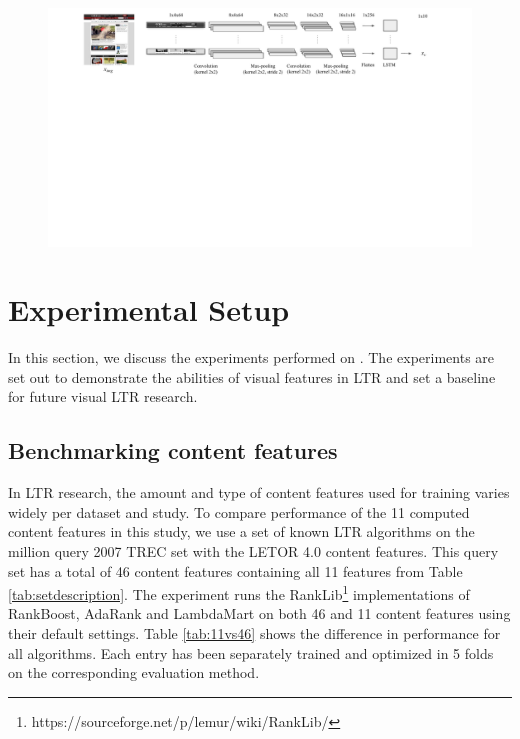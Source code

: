 \begin{figure}[t]
\centering
\includegraphics[clip,trim=0 10cm 0 0, width=20cm]{images/vip-features.pdf}
   \label{fig:ViPfeat} 
\end{figure}

\section{Experimental Setup}\label{sec:experiments}
In this section, we discuss the experiments performed on \datasetname. The experiments are set out to demonstrate the abilities of visual features in \ac{LTR} and set a baseline for future visual \ac{LTR} research.


\subsection{Benchmarking content features}
In \ac{LTR} research, the amount and type of content features used for training varies widely per dataset and study. To compare performance of the 11 computed content features in this study, we use a set of known \ac{LTR} algorithms on the million query 2007 TREC set with the LETOR 4.0 content features. This query set has a total of 46 content features containing all 11 features from Table \ref{tab:setdescription}. The experiment runs the RankLib\footnote{https://sourceforge.net/p/lemur/wiki/RankLib/} implementations of RankBoost, AdaRank and LambdaMart on both 46 and 11 content features using their default settings. Table \ref{tab:11vs46} shows the difference in performance for all algorithms. Each entry has been separately trained and optimized in 5 folds on the corresponding evaluation method. 

